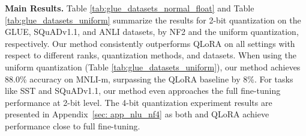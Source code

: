 \noindent \textbf{Main Results.} Table \ref{tab:glue_datasets_normal_float} and Table \ref{tab:glue_datasets_uniform} summarize the results for 2-bit quantization on the GLUE, SQuADv1.1, and ANLI datasets, by NF2 and the uniform quantization, respectively.
Our method consistently outperforms QLoRA on all settings with respect to different ranks, quantization methods, and datasets. When using the uniform quantization (Table \ref{tab:glue_datasets_uniform}), our method achieves 88.0\% accuracy on MNLI-m, surpassing the QLoRA baseline by 8\%. For tasks like SST and SQuADv1.1, our method even approaches the full fine-tuning performance at 2-bit level. The 4-bit quantization experiment results are presented in Appendix~\ref{sec: app_nlu_nf4} as both {\OurAlg} and QLoRA achieve performance close to full fine-tuning.
